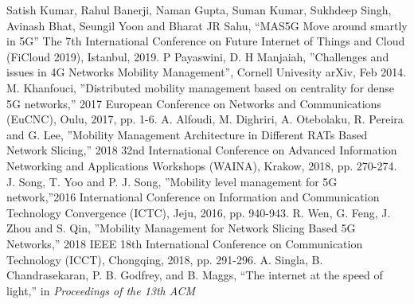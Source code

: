 \begin{multicols}{2}
\begin{thebibliography}{99}
 Satish Kumar, Rahul Banerji, Naman Gupta, Suman Kumar, Sukhdeep Singh, Avinash Bhat, Seungil Yoon and Bharat JR Sahu, “MAS5G Move around smartly in 5G” The 7th International Conference on Future Internet of Things and Cloud (FiCloud 2019), Istanbul, 2019.
 P Payaswini, D. H Manjaiah, ”Challenges and issues in 4G Networks Mobility Management”, Cornell Univesity arXiv, Feb 2014.
 M. Khanfouci, ”Distributed mobility management based on centrality for dense 5G networks,” 2017 European Conference on Networks and Communications (EuCNC), Oulu, 2017, pp. 1-6.
 A. Alfoudi, M. Dighriri, A. Otebolaku, R. Pereira and G. Lee, ”Mobility Management Architecture in Different RATs Based Network Slicing,” 2018 32nd International Conference on Advanced Information Networking and Applications Workshops (WAINA), Krakow, 2018, pp. 270-274.
 J. Song, T. Yoo and P. J. Song, ”Mobility level management for 5G network,”2016 International Conference on Information and Communication Technology Convergence (ICTC), Jeju, 2016, pp. 940-943.
 R. Wen, G. Feng, J. Zhou and S. Qin, ”Mobility Management for Network Slicing Based 5G Networks,” 2018 IEEE 18th International Conference on Communication Technology (ICCT), Chongqing, 2018, pp. 291-296.
 A. Singla, B. Chandrasekaran, P. B. Godfrey, and B. Maggs, “The internet at the speed of light,” in \textit{Proceedings of the 13th ACM}


\end{thebibliography}
\end{multicols}
